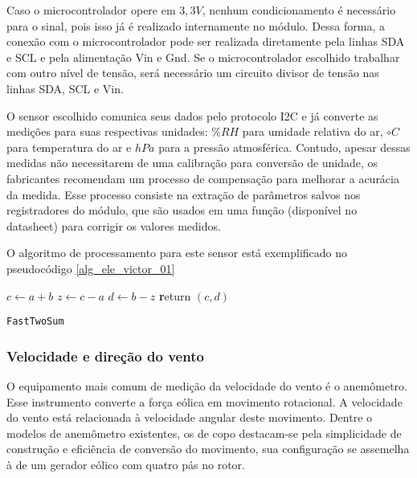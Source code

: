 			Caso o microcontrolador opere em $3,3V$, nenhum condicionamento é necessário para o sinal, pois isso já é realizado internamente no módulo. Dessa forma, a conexão com o microcontrolador pode ser realizada diretamente pela linhas SDA e SCL e pela alimentação Vin e Gnd. Se o microcontrolador escolhido trabalhar com outro nível de tensão, será necessário um circuito divisor de tensão nas linhas SDA, SCL e Vin.

			O sensor escolhido comunica seus dados pelo protocolo I2C e já converte as medições para suas respectivas unidades: $\% RH$ para umidade relativa do ar,  $\circ C$ para temperatura do ar e $hPa$ para a pressão atmosférica. Contudo, apesar dessas medidas não necessitarem de uma calibração para conversão de unidade, os fabricantes recomendam um processo de compensação para melhorar a acurácia da medida. Esse processo consiste na extração de parâmetros salvos nos registradores do módulo, que são usados em uma função (disponível no datasheet) para corrigir os valores medidos.

			O algoritmo de processamento para este sensor está exemplificado no pseudocódigo \ref{alg_ele_victor_01}

			\begin{center}
				\begin{minipage}{0.5\linewidth} %
					\begin{algorithm}[H]
						\label{alg_ele_victor_01}
						\medskip
						$c \leftarrow a + b$ \;
						$z \leftarrow c - a$ \;
						$d \leftarrow b - z$ \;
						{\textbf return} $(c,d)$ \;
						\caption{\texttt{FastTwoSum}} %
						\label{alg:fastTwoSum}   %
					\end{algorithm}
				\end{minipage}
			\end{center}

		\subsubsection{Velocidade e direção do vento}

			O equipamento mais comum de medição da velocidade do vento é o anemômetro. Esse instrumento converte a força eólica em movimento rotacional. A velocidade do vento está relacionada à velocidade angular deste movimento. Dentre o modelos de anemômetro existentes, os de copo destacam-se pela simplicidade de construção e eficiência de conversão do movimento, sua configuração se assemelha à de um gerador eólico com quatro pás no rotor.

